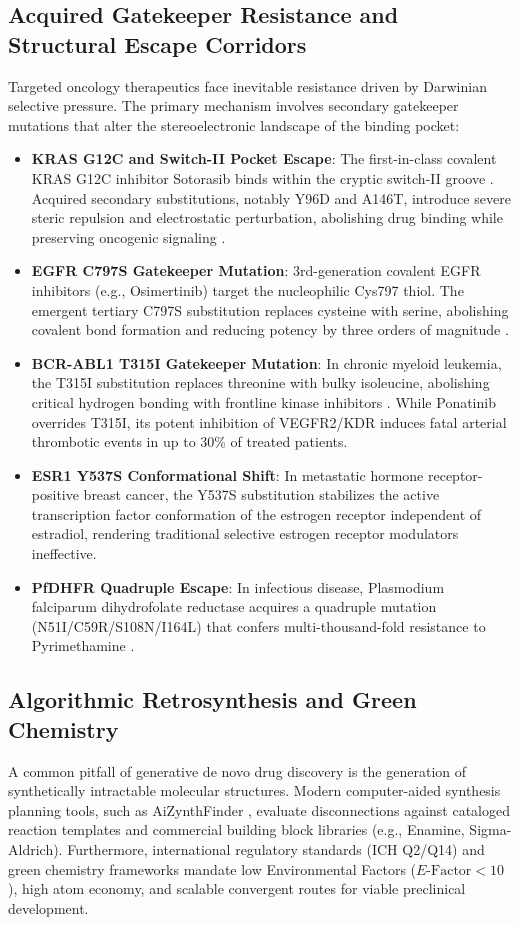 \documentclass[10pt,journal,compsoc]{IEEEtran}
\begin{document}
\subsection{Acquired Gatekeeper Resistance and Structural Escape Corridors}
Targeted oncology therapeutics face inevitable resistance driven by Darwinian selective pressure. The primary mechanism involves secondary gatekeeper mutations that alter the stereoelectronic landscape of the binding pocket:
\begin{itemize}
    \item \textbf{KRAS G12C and Switch-II Pocket Escape}: The first-in-class covalent KRAS G12C inhibitor Sotorasib binds within the cryptic switch-II groove \cite{ostrem2013kras,canon2019clinical}. Acquired secondary substitutions, notably Y96D and A146T, introduce severe steric repulsion and electrostatic perturbation, abolishing drug binding while preserving oncogenic signaling \cite{tanaka2021clinical}.
    \item \textbf{EGFR C797S Gatekeeper Mutation}: 3rd-generation covalent EGFR inhibitors (e.g., Osimertinib) target the nucleophilic Cys797 thiol. The emergent tertiary C797S substitution replaces cysteine with serine, abolishing covalent bond formation and reducing potency by three orders of magnitude \cite{thress2015acquired}.
    \item \textbf{BCR-ABL1 T315I Gatekeeper Mutation}: In chronic myeloid leukemia, the T315I substitution replaces threonine with bulky isoleucine, abolishing critical hydrogen bonding with frontline kinase inhibitors \cite{shah2004overriding}. While Ponatinib overrides T315I, its potent inhibition of VEGFR2/KDR induces fatal arterial thrombotic events in up to 30\% of treated patients.
    \item \textbf{ESR1 Y537S Conformational Shift}: In metastatic hormone receptor-positive breast cancer, the Y537S substitution stabilizes the active transcription factor conformation of the estrogen receptor independent of estradiol, rendering traditional selective estrogen receptor modulators ineffective.
    \item \textbf{PfDHFR Quadruple Escape}: In infectious disease, Plasmodium falciparum dihydrofolate reductase acquires a quadruple mutation (N51I/C59R/S108N/I164L) that confers multi-thousand-fold resistance to Pyrimethamine \cite{singh2011resurgence}.
\end{itemize}

\subsection{Algorithmic Retrosynthesis and Green Chemistry}
A common pitfall of generative de novo drug discovery is the generation of synthetically intractable molecular structures. Modern computer-aided synthesis planning tools, such as AiZynthFinder \cite{genheden2020aizynthfinder}, evaluate disconnections against cataloged reaction templates and commercial building block libraries (e.g., Enamine, Sigma-Aldrich). Furthermore, international regulatory standards (ICH Q2/Q14) and green chemistry frameworks mandate low Environmental Factors ($E\text{-Factor} < 10$), high atom economy, and scalable convergent routes for viable preclinical development.
\end{document}
